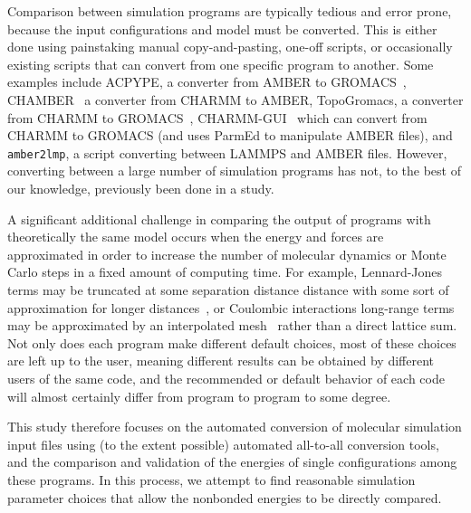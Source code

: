 Comparison between simulation programs are typically tedious and error
prone, because the input configurations and model must be converted.
This is either done using painstaking manual copy-and-pasting,
one-off scripts, or occasionally existing scripts that can convert
from one specific program to another.  Some examples include ACPYPE, a
converter from AMBER to GROMACS~\citep{sousa_da_silva_acpype_2012},
CHAMBER~\citep{crowley_chamber:_2009} a converter from CHARMM to
AMBER, TopoGromacs, a converter from CHARMM to
GROMACS~\citep{vermaas_topogromacs:_2016},
CHARMM-GUI~\citep{lee_charmm-gui_2016} which can convert from CHARMM
to GROMACS (and uses ParmEd to manipulate AMBER files), and {\tt
  amber2lmp}, a script converting between LAMMPS and AMBER
files. However, converting between a large number of simulation
programs has not, to the best of our knowledge, previously been done
in a study.

A significant additional challenge in comparing the output of programs
with theoretically the same model occurs when the energy and forces
are approximated in order to increase the number of molecular dynamics
or Monte Carlo steps in a fixed amount of computing time. For example,
Lennard-Jones terms may be truncated at some separation distance
distance with some sort of approximation for longer
distances~\citep{AllenAndTildesley,shirts_accurate_2007,wu_isotropic_2005},
or Coulombic interactions long-range terms may be approximated by an
interpolated mesh~\citep{essmann_smooth_1995} rather than a direct
lattice sum.  Not only does each program make different default
choices, most of these choices are left up to the user, meaning
different results can be obtained by different users of the same code,
and the recommended or default behavior of each code will almost
certainly differ from program to program to some degree.

This study therefore focuses on the automated conversion of molecular
simulation input files using (to the extent possible) automated
all-to-all conversion tools, and the comparison and validation of the
energies of single configurations among these programs. In this
process, we attempt to find reasonable simulation parameter choices
that allow the nonbonded energies to be directly compared.

